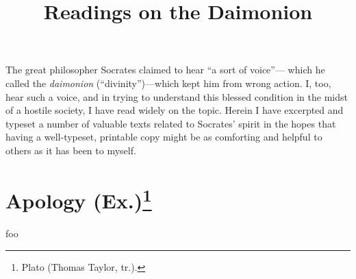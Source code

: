 \documentclass{article}
\title{Readings on the Daimonion}
\date{}
\begin{document}
\maketitle

\noindent The great philosopher Socrates claimed to hear ``a sort of voice''---
which he called the \textit{daimonion} (``divinity'')---which kept him from
wrong action. I, too, hear such a voice, and in trying to understand this
blessed condition in the midst of a hostile society, I have read widely on the
topic. Herein I have excerpted and typeset a number of valuable texts related
to Socrates' spirit in the hopes that having a well-typeset, printable copy
might be as comforting and helpful to others as it has been to myself.


\section*{Apology (Ex.)\footnote{Plato (Thomas Taylor, tr.).}}

foo
\end{document}
